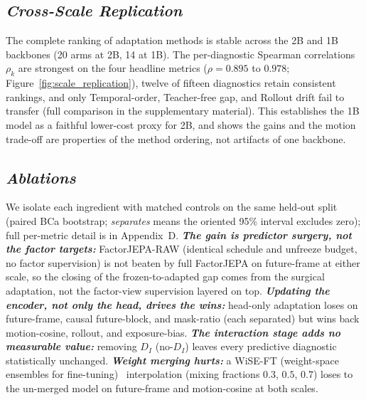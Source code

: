 \subsection{\textbf{\emph{Cross-Scale Replication}}}
The complete ranking of adaptation methods is stable across the 2B and 1B backbones (20 arms at 2B, 14 at 1B).
The per-diagnostic Spearman correlations $\rho_k$ are strongest on the four headline
metrics ($\rho=0.895$ to $0.978$; Figure~\ref{fig:scale_replication}), twelve of
fifteen diagnostics retain consistent rankings, and only Temporal-order, Teacher-free
gap, and Rollout drift fail to transfer (full comparison in
the supplementary material). This establishes the 1B model as a faithful
lower-cost proxy for 2B, and shows the gains and the motion trade-off are
properties of the method ordering, not artifacts of one backbone.


\subsection{\textbf{\emph{Ablations}}}

We isolate each ingredient with matched controls on the same held-out split (paired
BCa bootstrap; \emph{separates} means the oriented 95\% interval excludes zero); full
per-metric detail is in Appendix~D.
\textbf{\emph{The gain is predictor surgery, not the factor targets:}}
FactorJEPA-RAW (identical schedule and unfreeze budget, no factor supervision) is not
beaten by full FactorJEPA on future-frame at either scale, so the closing of the
frozen-to-adapted gap comes from the surgical adaptation, not the factor-view
supervision layered on top.
\textbf{\emph{Updating the encoder, not only the head, drives the wins:}}
head-only adaptation loses on future-frame, causal future-block, and mask-ratio (each
separated) but wins back motion-cosine, rollout, and exposure-bias.
\textbf{\emph{The interaction stage adds no measurable value:}} removing $D_I$
(no-$D_I$) leaves every predictive diagnostic statistically unchanged.
\textbf{\emph{Weight merging hurts:}} a WiSE-FT (weight-space ensembles for fine-tuning)~\cite{wortsman2022wiseft} interpolation (mixing fractions
$0.3$, $0.5$, $0.7$) loses to the un-merged model on future-frame and motion-cosine at
both scales.

